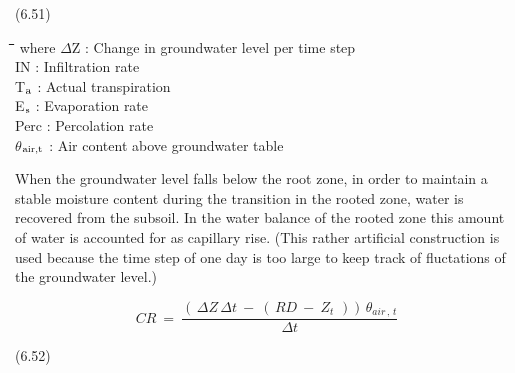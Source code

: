\documentclass[11pt]{article}
\begin{document}
 \bigskip
\strut\hfill (6.51)

\nwln
\begin{tabbing}
\hspace{1.27cm}\=\hspace{1.27cm}\=\hspace{1.27cm}\=\hspace{1.27cm}\=%
\hspace{1.27cm}\=\hspace{1.27cm}\=\hspace{1.27cm}\=\hspace{1.27cm}\=%
\hspace{1.27cm}\=\hspace{1.27cm}\=\kill
where\> $\Delta$Z\> : Change in groundwater level per time step\> \> \> \> \> \> \> \> [cm d$^{{\rm -1}}$]\\
\>IN\> : Infiltration rate\> \> \> \> \> \> \> \> [cm d$^{{\rm -1}}$]\\
\>T$_{{\rm a}}$\> : Actual transpiration\> \> \> \> \> \> \> \> [cm d$^{{\rm -1}}$]\\
\>E$_{{\rm s}}$\> : Evaporation rate\> \> \> \> \> \> \> \> [cm d$^{{\rm -1}}$]\\
\>Perc\> : Percolation rate\> \> \> \> \> \> \> \> [cm d$^{{\rm -1}}$]\\
\>$\theta$$_{{\rm air,t}}$\> : Air content above groundwater table\> \> \> \> \> \> \> \> [cm$^{{\rm 3}}$ cm$^{{\rm -3}}$]
\end{tabbing}

\bigskip
\bigskip
When the groundwater level falls below the root zone, in order to maintain a stable
moisture content during the transition in the rooted zone, water is recovered from the
subsoil. In the water balance of the rooted zone this amount of water is accounted for as
capillary rise. (This rather artificial construction is used because the time step of one day
is too large to keep track of fluctations of the groundwater level.)

\begin{displaymath}
CR ~=~{\frac{ (\, \Delta Z\, \Delta t ~-~ (\, RD ~-~ Z _{t} \,\, ))\, \theta  _{air\, ,\, t} }{\Delta t}}
\end{displaymath}

 \bigskip
\strut\hfill (6.52)
\end{document}
